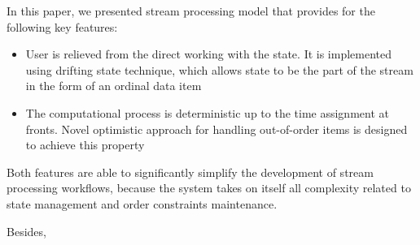 
\label {fs-conclusions}



In this paper, we presented stream processing model that provides for the following key features:

\begin{itemize}
    \item User is relieved from the direct working with the state. It is implemented using drifting state technique, which allows state to be the part of the stream in the form of an ordinal data item  
    \item The computational process is deterministic up to the time assignment at fronts. Novel optimistic approach for handling out-of-order items is designed to achieve this property
\end{itemize}

Both features are able to significantly simplify the development of stream processing workflows, because the system takes on itself all complexity related to state management and order constraints maintenance.

Besides, 

